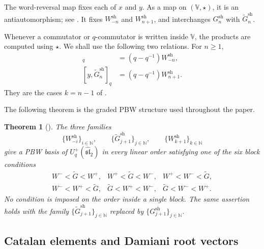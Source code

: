 \documentclass[11pt]{extarticle}
\newtheorem{theorem}{Theorem}[section]
\theoremstyle{definition}
\theoremstyle{remark}
\numberwithin{equation}{section}
\newcommand{\N}{\mathbb N}
\newcommand{\Uplus}{U_q^+(\widehat{\mathfrak{sl}}_2)}
\newcommand{\Vsh}{\mathbb V}
\newcommand{\sh}{\mathrm{sh}}
\newcommand{\qcomm}[2]{[ #1,#2 ]_q}
\begin{document}
The word-reversal map fixes each of \(x\) and \(y\).  As a map on
\((\Vsh,\star)\), it is an antiautomorphism; see
\cite[Lemma~4.1]{Terwilliger2019Alternating}.  It fixes
\(W_{-n}^{\sh}\) and \(W_{n+1}^{\sh}\), and interchanges
\(G_n^{\sh}\) with \(\widetilde G_n^{\sh}\).

Whenever a commutator or \(q\)-commutator is written inside \(\Vsh\), the
products are computed using \(\star\).  We shall use the following two
relations.  For \(n\geq1\),
\begin{align}
\qcomm{\widetilde G_n^{\sh}}{x}
 &=(q-q^{-1})W_{-n}^{\sh},
\label{eq:qshuffle-Wminus}\\
\qcomm{y}{\widetilde G_n^{\sh}}
 &=(q-q^{-1})W_{n+1}^{\sh}.
\label{eq:qshuffle-Wplus}
\end{align}
They are the cases \(k=n-1\) of
\cite[Proposition~5.7, equations~(38)--(39)]
{Terwilliger2019Alternating}.

The following theorem is the graded PBW structure used throughout the paper.

\begin{theorem}[{{\cite[Theorems~10.1 and~10.2]{Terwilliger2019Alternating}}}]
\label{thm:qshuffle-twelve}
The three families
\[
 \{W_{-i}^{\sh}\}_{i\in\N},\qquad
 \{\widetilde G_{j+1}^{\sh}\}_{j\in\N},\qquad
 \{W_{k+1}^{\sh}\}_{k\in\N}
\]
give a PBW basis of \(\Uplus\) in every linear order satisfying one of the
six block conditions
\begin{equation}
\label{eq:six-shuffle-orders}
\begin{array}{lll}
W^-<\widetilde G<W^+,&
W^+<\widetilde G<W^-,&
W^+<W^-<\widetilde G,\\[1mm]
W^-<W^+<\widetilde G,&
\widetilde G<W^+<W^-,&
\widetilde G<W^-<W^+.
\end{array}
\end{equation}
No condition is imposed on the order inside a single block.  The same
assertion holds with the family
\(\{\widetilde G_{j+1}^{\sh}\}_{j\in\N}\) replaced by
\(\{G_{j+1}^{\sh}\}_{j\in\N}\).
\end{theorem}


\subsection{Catalan elements and Damiani root vectors}
\end{document}
